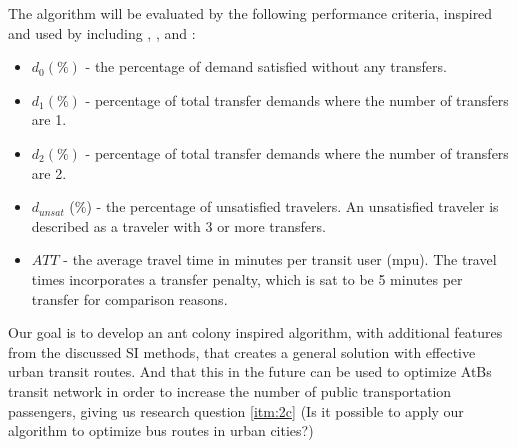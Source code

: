 The algorithm will be evaluated by the following performance criteria, inspired and used by including \citep{kechagiopoulos14}, \citep{mandl80}, \citep{nikolic14} and \citep{fan09}: 
\begin{itemize}
\item $d_0 (\%)$ - the percentage of demand satisfied without any transfers.
\item $d_1 (\%)$ - percentage of total transfer demands where the number of transfers are 1. 
\item $d_2 (\%)$ - percentage of total transfer demands where the number of transfers are 2. 
\item $d_{unsat}$ (\%) - the percentage of unsatisfied travelers. An unsatisfied traveler is described as a traveler with 3 or more transfers.
\item $ATT$  - the average travel time in minutes per transit user (mpu). The travel times incorporates a transfer penalty, which is sat to be 5 minutes per transfer for comparison reasons.
\end{itemize}

Our goal is to develop an ant colony inspired algorithm, with additional features from the discussed SI methods, that creates a general solution with effective urban transit routes. And that this in the future can be used to optimize AtBs transit network in order to increase the number of public transportation passengers, giving us research question \vref{itm:2c} (Is it possible to apply our algorithm to optimize bus routes in urban cities?)
